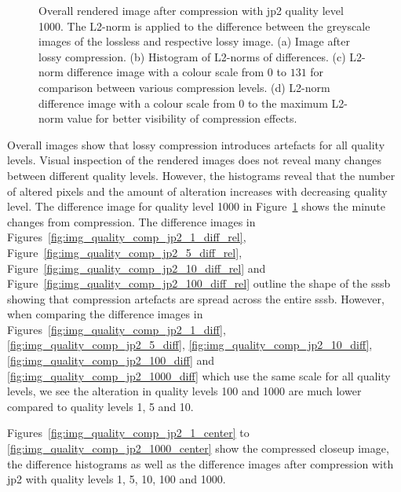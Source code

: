 \begin{figure}[htb]
\begin{subfigure}[b]{0.48\textwidth}
        \caption{}
        \label{fig:img_quality_comp_jp2_1000_diff_rel}
    \end{subfigure}
    \caption{Overall rendered image after compression with \gls{jp2} quality level 1000. The L2-norm is applied to the difference between the greyscale images of the lossless and respective lossy image. (a) Image after lossy compression. (b) Histogram of L2-norms of differences. (c) L2-norm difference image with a colour scale from $0$ to $131$ for comparison between various compression levels. (d) L2-norm difference image with a colour scale from $0$ to the maximum L2-norm value for better visibility of compression effects.}
    \label{fig:img_quality_comp_jp2_1000}
\end{figure}

Overall images show that lossy compression introduces artefacts for all quality levels. Visual inspection of the rendered images does not reveal many changes between different quality levels. However, the histograms reveal that the number of altered pixels and the amount of alteration increases with decreasing quality level. The difference image for quality level 1000 in Figure~\ref{fig:img_quality_comp_jp2_1000_diff_rel} shows the minute changes from compression. The difference images in Figures~\ref{fig:img_quality_comp_jp2_1_diff_rel}, Figure~\ref{fig:img_quality_comp_jp2_5_diff_rel}, Figure~\ref{fig:img_quality_comp_jp2_10_diff_rel} and Figure~\ref{fig:img_quality_comp_jp2_100_diff_rel} outline the shape of the \gls{sssb} showing that compression artefacts are spread across the entire \gls{sssb}. However, when comparing the difference images in Figures~\ref{fig:img_quality_comp_jp2_1_diff}, \ref{fig:img_quality_comp_jp2_5_diff}, \ref{fig:img_quality_comp_jp2_10_diff}, \ref{fig:img_quality_comp_jp2_100_diff} and \ref{fig:img_quality_comp_jp2_1000_diff} which use the same scale for all quality levels, we see the alteration in quality levels \SI{100}{} and \SI{1000}{} are much lower compared to quality levels \SI{1}{}, \SI{5}{} and \SI{10}{}.

Figures~\ref{fig:img_quality_comp_jp2_1_center} to \ref{fig:img_quality_comp_jp2_1000_center} show the compressed closeup image, the difference histograms as well as the difference images after compression with \gls{jp2} with quality levels \SI{1}{}, \SI{5}{}, \SI{10}{}, \SI{100}{} and \SI{1000}{}.

